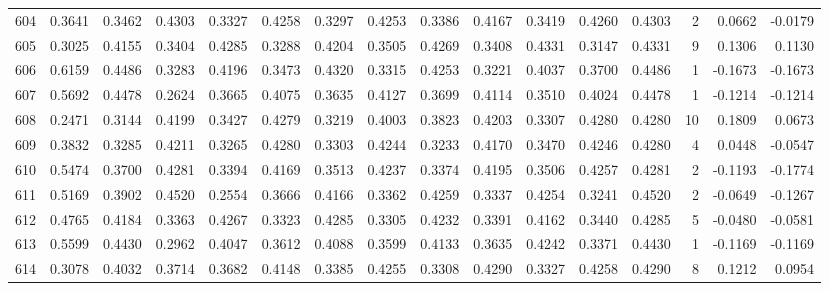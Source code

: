 \begin{tabular}{lrrrrrrrrrrrrrrr}
604 &      0.3641 &  0.3462 &  0.4303 &  0.3327 &  0.4258 &  0.3297 &  0.4253 &  0.3386 &  0.4167 &  0.3419 &   0.4260 &     0.4303 &      2 &                    0.0662 &                    -0.0179 \\
605 &      0.3025 &  0.4155 &  0.3404 &  0.4285 &  0.3288 &  0.4204 &  0.3505 &  0.4269 &  0.3408 &  0.4331 &   0.3147 &     0.4331 &      9 &                    0.1306 &                     0.1130 \\
606 &      0.6159 &  0.4486 &  0.3283 &  0.4196 &  0.3473 &  0.4320 &  0.3315 &  0.4253 &  0.3221 &  0.4037 &   0.3700 &     0.4486 &      1 &                   -0.1673 &                    -0.1673 \\
607 &      0.5692 &  0.4478 &  0.2624 &  0.3665 &  0.4075 &  0.3635 &  0.4127 &  0.3699 &  0.4114 &  0.3510 &   0.4024 &     0.4478 &      1 &                   -0.1214 &                    -0.1214 \\
608 &      0.2471 &  0.3144 &  0.4199 &  0.3427 &  0.4279 &  0.3219 &  0.4003 &  0.3823 &  0.4203 &  0.3307 &   0.4280 &     0.4280 &     10 &                    0.1809 &                     0.0673 \\
609 &      0.3832 &  0.3285 &  0.4211 &  0.3265 &  0.4280 &  0.3303 &  0.4244 &  0.3233 &  0.4170 &  0.3470 &   0.4246 &     0.4280 &      4 &                    0.0448 &                    -0.0547 \\
610 &      0.5474 &  0.3700 &  0.4281 &  0.3394 &  0.4169 &  0.3513 &  0.4237 &  0.3374 &  0.4195 &  0.3506 &   0.4257 &     0.4281 &      2 &                   -0.1193 &                    -0.1774 \\
611 &      0.5169 &  0.3902 &  0.4520 &  0.2554 &  0.3666 &  0.4166 &  0.3362 &  0.4259 &  0.3337 &  0.4254 &   0.3241 &     0.4520 &      2 &                   -0.0649 &                    -0.1267 \\
612 &      0.4765 &  0.4184 &  0.3363 &  0.4267 &  0.3323 &  0.4285 &  0.3305 &  0.4232 &  0.3391 &  0.4162 &   0.3440 &     0.4285 &      5 &                   -0.0480 &                    -0.0581 \\
613 &      0.5599 &  0.4430 &  0.2962 &  0.4047 &  0.3612 &  0.4088 &  0.3599 &  0.4133 &  0.3635 &  0.4242 &   0.3371 &     0.4430 &      1 &                   -0.1169 &                    -0.1169 \\
614 &      0.3078 &  0.4032 &  0.3714 &  0.3682 &  0.4148 &  0.3385 &  0.4255 &  0.3308 &  0.4290 &  0.3327 &   0.4258 &     0.4290 &      8 &                    0.1212 &                     0.0954 \\

\end{tabular}

